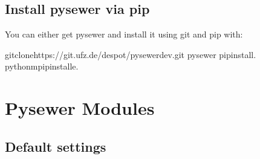 \documentclass[letterpaper,10pt,english]{sphinxmanual}
\begin{document}
\section{Install pysewer via pip}
\label{\detokenize{install:install-pysewer-via-pip}}
\sphinxAtStartPar
You can either get pysewer and install it using git and pip with:

\begin{sphinxVerbatim}[commandchars=\\\{\}]
gitclonehttps://git.ufz.de/despot/pysewer\PYGZus{}dev.git
pysewer
pipinstall.
python\PYGZhy{}mpipinstall\PYGZhy{}e.
\end{sphinxVerbatim}

\sphinxstepscope


\chapter{Pysewer Modules}
\label{\detokenize{modules:pysewer-modules}}\label{\detokenize{modules::doc}}
\sphinxstepscope


\section{Default settings}
\label{\detokenize{pysewer:module-pysewer.config.settings}}\label{\detokenize{pysewer:default-settings}}\label{\detokenize{pysewer::doc}}
\end{document}
